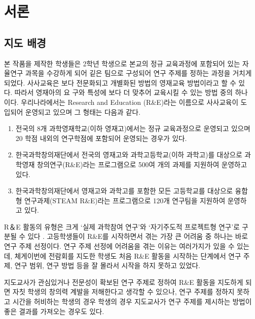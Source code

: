 \section{서론}


\subsection{지도 배경}

본 작품을 제작한 학생들은 2학년 학생으로 본교의 정규 교육과정에 포함되어 있는 자율연구 과목을 수강하게 되어 깉은 팀으로 구성되어 연구 주제를 정하는 과정을 거치게 되었다. 사사교육은 보다 전문화되고 개별화된 방법의 영재교육 방법이라고 할 수 있다. 따라서 영재아의 요
구와 특성에 보다 더 맞추어 교육시킬 수 있는 방법 중의 하나이다. 우리나라에서는 Research and Education (R\&E)라는 이름으로 사사교육이 도입되어 운영되고 있으며 그 형태는 다음과 같다. 
\begin{enumerate}
    \item 전국의 8개 과학영재학교(이하 영재고)에서는 정규 교육과정으로 운영되고 있으며 20 학점 내외의 연구학점에 포함되어 운영되는 경우가 있다. 
    \item 한국과학창의재단에서 전국의 영재고와 과학고등학교(이하 과학고)를 대상으로 과학영재 창의연구(R\&E)라는 프로그램으로 500여 개의 과제를 지원하여 운영하고 있다. 
    \item 한국과학창의재단에서 영재고와 과학고를 포함한 모든 고등학교를 대상으로 융합형 연구과제(STEAM R\&E)라는 프로그램으로 120개 연구팀을 지원하여 운영하고 있다. 
\end{enumerate}

R＆E 활동의 유형은 크게 ‘실제 과학참여 연구’와 ‘자기주도적 프로젝트형 연구’로 구분될 수 있다 \cite{parkjw-2009-1}. 고등학생들이 R\&E를 시작하면서 겪는 가장 큰 어려움 중 하나는 바로 연구 주제 선정이다. 연구 주제 선정에 어려움을 겪는 이유는 여러가지가 있을 수 있는데, 체게이번에 전람회를 지도한 학생도 처음 R\&E 활동을 시작하는 단계에서 연구 주제, 연구 범위, 연구 방법 등을 잘 몰라서 시작을 하지 못하고 있었다. 

지도교사가 관심있거나 전문성이 확보된 연구 주제로 정하여 R\&E 활동을 지도하게 되면 자칫 학생의 창의력 계발을 저해한다고 생각할 수 있으나, 연구 주제를 정하지 못하고 시간을 허비하는 학생의 경우 학생의 경우 지도교사가 연구  주제를 제시하는 방법이 좋은 결과를 가져오는 경우도 있다. 

